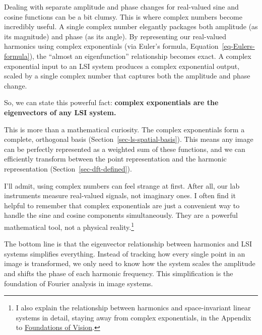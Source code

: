 \documentclass[
  letterpaper,
]{book}
\begin{document}
Dealing with separate amplitude and phase changes for real-valued sine
and cosine functions can be a bit clumsy. This is where complex numbers
become incredibly useful. A single complex number elegantly packages
both amplitude (as its magnitude) and phase (as its angle). By
representing our real-valued harmonics using complex exponentials (via
Euler's formula, Equation~\ref{eq-Eulers-formula}), the ``almost an
eigenfunction'' relationship becomes exact. A complex exponential input
to an LSI system produces a complex exponential output, scaled by a
single complex number that captures both the amplitude and phase change.

So, we can state this powerful fact: \textbf{complex exponentials are
the eigenvectors of any LSI system.}

This is more than a mathematical curiosity. The complex exponentials
form a complete, orthogonal basis (Section~\ref{sec-ls-spatial-basis}).
This means any image can be perfectly represented as a weighted sum of
these functions, and we can efficiently transform between the point
representation and the harmonic representation
(Section~\ref{sec-dft-defined}).

I'll admit, using complex numbers can feel strange at first. After all,
our lab instruments measure real-valued signals, not imaginary ones. I
often find it helpful to remember that complex exponentials are just a
convenient way to handle the sine and cosine components simultaneously.
They are a powerful mathematical tool, not a physical
reality.\footnote{I also explain the relationship between harmonics and
  space-invariant linear systems in detail, staying away from complex
  exponentials, in the Appendix to
  \href{https://wandell.github.io/FOV-1995/appendix.html}{Foundations of
  Vision}.}

The bottom line is that the eigenvector relationship between harmonics
and LSI systems simplifies everything. Instead of tracking how every
single point in an image is transformed, we only need to know how the
system scales the amplitude and shifts the phase of each harmonic
frequency. This simplification is the foundation of Fourier analysis in
image systems.
\end{document}
